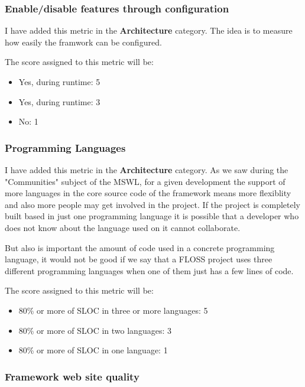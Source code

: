 \documentclass[a4paper,12pt]{book}
\begin{document}
\subsubsection{Enable/disable features through configuration}
\label{Enable/disable features through configuration}

I have added this metric in the \textbf{Architecture} category. The idea is to measure how easily the framwork can be configured.

The score assigned to this metric will be:
\begin{itemize}
 \item Yes, during runtime: 5
 \item Yes, during runtime: 3
 \item No: 1
\end{itemize}

\subsubsection{Programming Languages}
\label{Programming Languages}

I have added this metric in the \textbf{Architecture} category. As we saw during the "Communities" subject of the MSWL, for a given development the support of more languages in the core source code of the framework means more flexiblity and also more people may get involved in the project. If the project is completely built based in just one programming language it is possible that a developer who does not know about the language used on it cannot collaborate.

But also is important the amount of code used in a concrete programming language, it would not be good if we say that a FLOSS project uses three different programming languages when one of them just has a few lines of code.

The score assigned to this metric will be:
\begin{itemize}
 \item 80\% or more of SLOC in three or more languages: 5
 \item 80\% or more of SLOC in two languages: 3
 \item 80\% or more of SLOC in one language: 1
\end{itemize}

\subsubsection{Framework web site quality}
\label{Framework web site quality}
\end{document}
